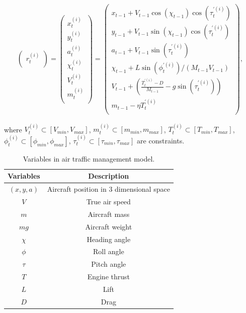 \begin{equation}
\begin{aligned}
  \begin{pmatrix}
    r^{(i)}_{t}    \\ 
  \end{pmatrix}
  =
  \begin{pmatrix}
    x^{(i)}_{t}    \\ 
    y^{(i)}_{t}    \\ 
    a^{(i)}_{t}    \\ 
    \chi^{(i)}_{t} \\ 
    V^{(i)}_{t}    \\ 
    m^{(i)}_{t}    \\ 
  \end{pmatrix}
  =
  \begin{pmatrix}
    x_{t-1}   + V_{t-1} \cos(\chi_{t-1}) \cos(\tau^{\prime(i)}_{t}) \\
    y_{t-1}   + V_{t-1} \sin(\chi_{t-1}) \cos(\tau^{\prime(i)}_{t}) \\ 
    a_{t-1}   + V_{t-1} \sin(\tau^{\prime(i)}_{t}) \\
    \chi_{t-1} + L \sin(\phi^{\prime(i)}_{t})/(M_{t-1} V_{t-1}) \\
    V_{t-1}   + (\frac{T^{\prime(i)}_{t}-D}{M_{t-1}} - g \sin(\tau^{\prime(i)}_{t})) \\
    m_{t-1}   - \eta T^{\prime(i)}_{t}  \\
  \end{pmatrix}
	\mbox{, }
\end{aligned}
\label{eq:atm_s}
\end{equation}

where $V^{(i)}_{t} \subset [V_{min}, V_{max}]$, $m^{(i)}_{t} \subset [m_{min}, m_{max}]$, $T^{(i)}_{t} \subset [T_{min}, T_{max}]$, $\phi^{(i)}_{t} \subset [\phi_{min}, \phi_{max}]$, $\tau^{(i)}_{t} \subset [\tau_{min}, \tau_{max}]$ are constraints.

\begin{table}
	\setlength{\tabcolsep}{3pt}
	\begin{spacing}{1.0}
	\caption{Variables in air traffic management model.}
	\label{tab:atm_variables}
	\footnotesize
	\centering
	\smallskip
		\begin{tabular}{c|c}
			\hline
			 Variables & Description\\
			\hline
			\hline
			$(x,y,a)$ & Aircraft position in 3 dimensional space \\
			$V$ & True air speed \\
			$m$ & Aircraft mass \\
			$mg$ & Aircraft weight \\
			$\chi$ & Heading angle \\
			$\phi$ & Roll angle \\
			$\tau$ & Pitch angle \\
			$T$ & Engine thrust \\
			$L$ & Lift \\
			$D$ & Drag \\
			\hline
		\end{tabular}
		\end{spacing}
\end{table}

